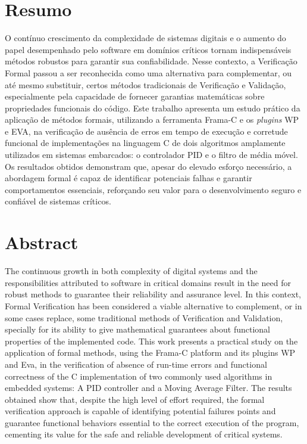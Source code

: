 \documentclass{article}
\begin{document}
\newpage
\section*{Resumo}
O contínuo crescimento da complexidade de sistemas digitais e o aumento do papel desempenhado pelo software em domínios críticos tornam indispensáveis métodos robustos para garantir sua
confiabilidade. Nesse contexto, a Verificação Formal passou a ser reconhecida como uma alternativa para complementar, ou até mesmo substituir, certos métodos tradicionais de Verificação e Validação, especialmente pela capacidade de
fornecer garantias matemáticas sobre propriedades funcionais do código. Este trabalho apresenta um estudo prático da aplicação de métodos formais, utilizando a ferramenta Frama-C e os \emph{plugins}
WP e EVA, na  verificação de ausência de erros em tempo de execução e corretude funcional de implementações na linguagem C de dois algoritmos amplamente utilizados em sistemas embarcados: o controlador PID e o
filtro de média móvel.
Os resultados obtidos demonstram que, apesar do elevado esforço necessário, a abordagem formal é capaz de identificar potenciais falhas e garantir comportamentos essenciais,
reforçando seu valor para o desenvolvimento seguro e confiável de sistemas críticos.

\section*{Abstract}
The continuous growth in both complexity of digital systems and the responsibilities attributed to software in critical domains result in the need for robust methods to guarantee their reliability and
assurance level. In this context, Formal Verification has been considered a viable alternative to complement, or in some cases replace, some traditional methods of Verification and Validation, specially for its
ability to give mathematical guarantees about functional properties of the implemented code. This work presents a practical study on the application of formal methods, using the Frama-C platform and
its plugins WP and Eva, in the verification of absence of run-time errors and functional correctness of the C
implementation of two commonly used algorithms in embedded systems: A PID controller and a Moving Average Filter.
The results obtained show that, despite the high level of effort required, the formal verification approach is capable of identifying potential failures
points and guarantee functional behaviors essential to the correct execution of the program,  cementing its value for the safe and reliable development of critical systems.
\end{document}
